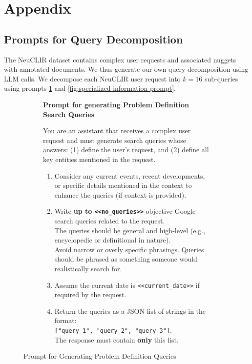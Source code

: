 \section{Appendix}

\subsection{Prompts for Query Decomposition}\label{sec:prompts}
The NeuCLIR dataset contains complex user requests and associated nuggets with annotated documents. We thus generate our own query decomposition using LLM calls. We decompose each NeuCLIR user request into \(k=16\) sub-queries using prompts \ref{fig:problem-definition-prompt} and \ref{fig:specialized-information-prompt}.

\begin{figure}[!ht]
  \centering
    \begin{subfigure}{\linewidth}
	\begin{tcolorbox}[colback=gray!5!white, colframe=black!75!black, boxrule=0.5pt, arc=3pt, left=6pt, right=6pt, top=4pt, bottom=4pt]
	
	\textbf{Prompt for generating Problem Definition Search Queries}

	You are an assistant that receives a complex user request and must generate search queries whose answers:
	(1) define the user's request, and 
	(2) define all key entities mentioned in the request.
	
	\begin{enumerate}
		\item Consider any current events, recent developments, or specific details mentioned in the context to enhance the queries (if context is provided).
		\item Write \textbf{up to \texttt{<<no\_queries>>}} objective Google search queries related to the request.\\
		      The queries should be general and high-level (e.g., encyclopedic or definitional in nature).\\
		      Avoid narrow or overly specific phrasings. Queries should be phrased as something someone would realistically search for.
		\item Assume the current date is \texttt{<<current\_date>>} if required by the request.
		\item Return the queries as a JSON list of strings in the format: \\
		      \texttt{["query 1", "query 2", "query 3"]}.\\
		      The response must contain \textbf{only} this list.
	\end{enumerate}
    \end{tcolorbox}
    \end{subfigure}
  \caption{Prompt for Generating Problem Definition Queries}
  \label{fig:problem-definition-prompt}
\end{figure}

